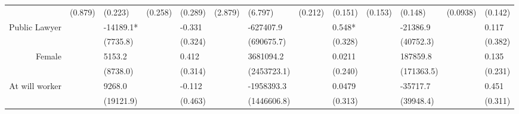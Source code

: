 \begin{tabular}{rrrrrrrrrrrrr}
      & \multicolumn{1}{l}{(0.879)} & \multicolumn{1}{l}{(0.223)} & \multicolumn{1}{l}{(0.258)} & \multicolumn{1}{l}{(0.289)} & \multicolumn{1}{l}{(2.879)} & \multicolumn{1}{l}{(6.797)} & \multicolumn{1}{l}{(0.212)} & \multicolumn{1}{l}{(0.151)} & \multicolumn{1}{l}{(0.153)} & \multicolumn{1}{l}{(0.148)} & \multicolumn{1}{l}{(0.0938)} & \multicolumn{1}{l}{(0.142)} \\
Public Lawyer & \multicolumn{1}{l}{} & \multicolumn{1}{l}{-14189.1*} & \multicolumn{1}{l}{} & \multicolumn{1}{l}{-0.331} & \multicolumn{1}{l}{} & \multicolumn{1}{l}{-627407.9} & \multicolumn{1}{l}{} & \multicolumn{1}{l}{0.548*} & \multicolumn{1}{l}{} & \multicolumn{1}{l}{-21386.9} & \multicolumn{1}{l}{} & \multicolumn{1}{l}{0.117} \\
      & \multicolumn{1}{l}{} & \multicolumn{1}{l}{(7735.8)} & \multicolumn{1}{l}{} & \multicolumn{1}{l}{(0.324)} & \multicolumn{1}{l}{} & \multicolumn{1}{l}{(690675.7)} & \multicolumn{1}{l}{} & \multicolumn{1}{l}{(0.328)} & \multicolumn{1}{l}{} & \multicolumn{1}{l}{(40752.3)} & \multicolumn{1}{l}{} & \multicolumn{1}{l}{(0.382)} \\
Female & \multicolumn{1}{l}{} & \multicolumn{1}{l}{5153.2} & \multicolumn{1}{l}{} & \multicolumn{1}{l}{0.412} & \multicolumn{1}{l}{} & \multicolumn{1}{l}{3681094.2} & \multicolumn{1}{l}{} & \multicolumn{1}{l}{0.0211} & \multicolumn{1}{l}{} & \multicolumn{1}{l}{187859.8} & \multicolumn{1}{l}{} & \multicolumn{1}{l}{0.135} \\
      & \multicolumn{1}{l}{} & \multicolumn{1}{l}{(8738.0)} & \multicolumn{1}{l}{} & \multicolumn{1}{l}{(0.314)} & \multicolumn{1}{l}{} & \multicolumn{1}{l}{(2453723.1)} & \multicolumn{1}{l}{} & \multicolumn{1}{l}{(0.240)} & \multicolumn{1}{l}{} & \multicolumn{1}{l}{(171363.5)} & \multicolumn{1}{l}{} & \multicolumn{1}{l}{(0.231)} \\
At will worker & \multicolumn{1}{l}{} & \multicolumn{1}{l}{9268.0} & \multicolumn{1}{l}{} & \multicolumn{1}{l}{-0.112} & \multicolumn{1}{l}{} & \multicolumn{1}{l}{-1958393.3} & \multicolumn{1}{l}{} & \multicolumn{1}{l}{0.0479} & \multicolumn{1}{l}{} & \multicolumn{1}{l}{-35717.7} & \multicolumn{1}{l}{} & \multicolumn{1}{l}{0.451} \\
      & \multicolumn{1}{l}{} & \multicolumn{1}{l}{(19121.9)} & \multicolumn{1}{l}{} & \multicolumn{1}{l}{(0.463)} & \multicolumn{1}{l}{} & \multicolumn{1}{l}{(1446606.8)} & \multicolumn{1}{l}{} & \multicolumn{1}{l}{(0.313)} & \multicolumn{1}{l}{} & \multicolumn{1}{l}{(39948.4)} & \multicolumn{1}{l}{} & \multicolumn{1}{l}{(0.311)} \\

\end{tabular}
